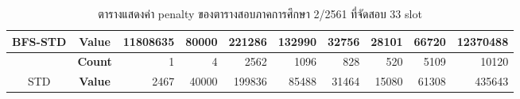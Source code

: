 \begin{table}[]
{\begin{tabular}{@{}ccrrrrrrrr@{}}
    \multirow{-2}{*}{BFS-STD}                    & \textbf{Value}                        & 11808635                       & 80000                          & 221286                         & 132990                         & 32756                          & 28101                          & 66720                          & 12370488                         \\ \midrule
                                                  & {\textbf{Count}} & {1}       & {4}       & {2562}    & {1096}    & {828}     & {520}     & {5109}    & {10120}     \\ \cmidrule(l){2-10} 
    \multirow{-2}{*}{STD} & {\textbf{Value}} & {2467}    & {40000}   & {199836}  & {85488}   & {31464}   & {15080}   & {61308}   & {435643}    \\ \bottomrule
    \end{tabular}%
    }
    \caption{ตารางแสดงค่า penalty ของตารางสอบภาคการศึกษา 2/2561 ที่จัดสอบ 33 slot}
    \label{tab:result_table_261_33}
\end{table}
